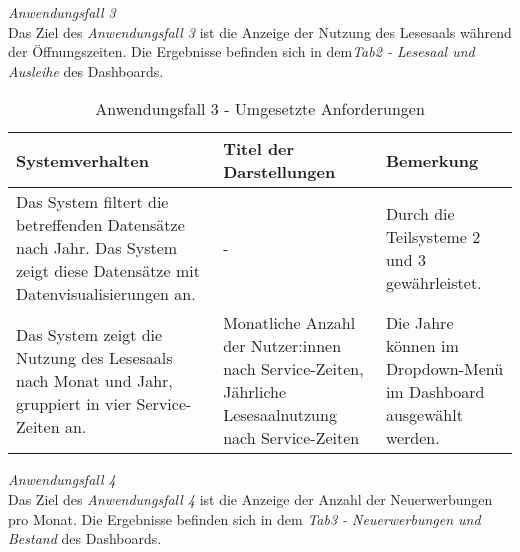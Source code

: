     \endgroup

\clearpage
\noindent
\textit{Anwendungsfall 3}\\
Das Ziel des \textit{Anwendungsfall 3} ist die Anzeige der Nutzung des Lesesaals während der Öffnungszeiten.
Die Ergebnisse befinden sich in dem\textit{Tab2 - Lesesaal und Ausleihe} des Dashboards.

\begingroup
    \setlength{\tabcolsep}{12pt} %
    \renewcommand{\arraystretch}{1.5}
    \begin{table}[h]
        \Large
        \centering
        \begin{adjustbox}{max width=\textwidth}
        \begin{tabular}{p{}p{}p{}}
           \toprule
           Systemverhalten        &Titel der Darstellungen&Bemerkung\\
           \midrule
           Das System filtert die betreffenden Datensätze nach Jahr. Das System zeigt diese Datensätze mit Datenvisualisierungen an.&-&Durch die Teilsysteme 2  und 3 gewährleistet.\\
           Das System zeigt die Nutzung des Lesesaals nach Monat und Jahr, gruppiert in vier Service-Zeiten an.&Monatliche Anzahl der Nutzer:innen nach Service-Zeiten, Jährliche Lesesaalnutzung nach Service-Zeiten& Die Jahre können im Dropdown-Menü im Dashboard ausgewählt werden.\\

        \bottomrule
        \end{tabular}
        \end{adjustbox}
        \caption{%
            Anwendungsfall 3 - Umgesetzte Anforderungen
        }
        \label{tab:Anwendungsfall 3 - Umgesetzte Anforderungen}
        \end{table}
\endgroup

\clearpage
\noindent
\textit{Anwendungsfall 4}\\
Das Ziel des \textit{Anwendungsfall 4} ist die Anzeige der Anzahl der Neuerwerbungen pro Monat.
Die Ergebnisse befinden sich in dem \textit{Tab3 - Neuerwerbungen und Bestand} des Dashboards.


